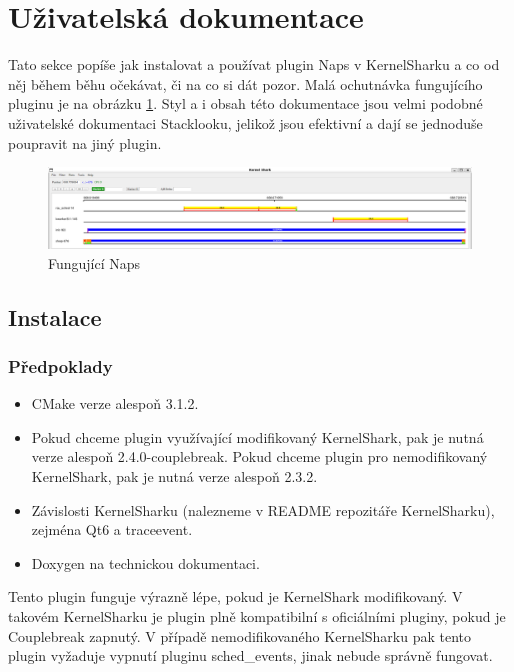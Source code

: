 \section{Uživatelská dokumentace}

Tato sekce popíše jak instalovat a používat plugin Naps v KernelSharku a co od něj během běhu očekávat, či na co si dát pozor. Malá ochutnávka fungujícího pluginu je na obrázku \ref{naps-workin}. Styl a i obsah této dokumentace jsou velmi podobné uživatelské dokumentaci Stacklooku, jelikož jsou efektivní a dají se jednoduše poupravit na jiný plugin.

\begin{figure}[p]\centering
    \includegraphics[width=140mm]{img/Naps/NapsWorking}
    \caption{Fungující Naps}
    \label{naps-workin}
\end{figure}

\subsection{Instalace}

\subsubsection{Předpoklady}

\begin{itemize}
  \item CMake verze alespoň 3.1.2.
  \item Pokud chceme plugin využívající modifikovaný KernelShark, pak je nutná verze alespoň 2.4.0-couplebreak. Pokud chceme plugin pro nemodifikovaný KernelShark, pak je nutná verze alespoň 2.3.2.
  \item Závislosti KernelSharku (nalezneme v README repozitáře KernelSharku), zejména Qt6 a traceevent.
  \item Doxygen na technickou dokumentaci.
\end{itemize}

Tento plugin funguje výrazně lépe, pokud je KernelShark modifikovaný. V takovém KernelSharku je plugin plně kompatibilní s oficiálními pluginy, pokud je Couplebreak zapnutý. V případě nemodifikovaného KernelSharku pak tento plugin vyžaduje vypnutí pluginu sched\_events, jinak nebude správně fungovat.

